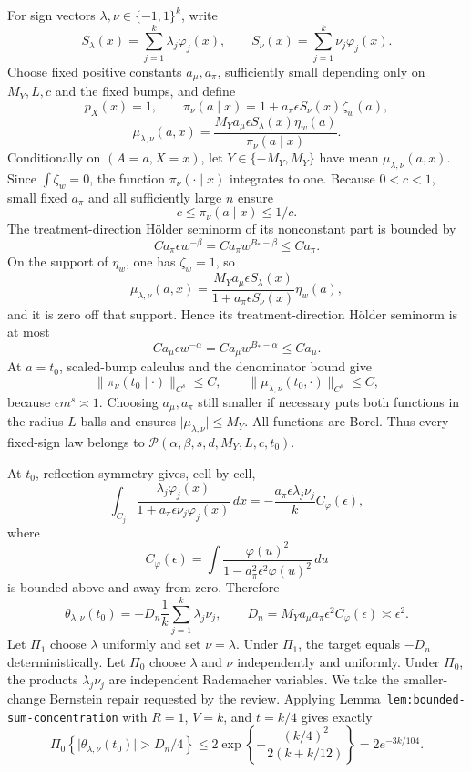 For sign vectors \(\lambda,\nu\in\{-1,1\}^k\), write
\[
S_\lambda(x)=\sum_{j=1}^k\lambda_j\varphi_j(x),
\qquad
S_\nu(x)=\sum_{j=1}^k\nu_j\varphi_j(x).
\]
Choose fixed positive constants \(a_\mu,a_\pi\), sufficiently small depending only on \(M_Y,L,c\) and the fixed bumps, and define
\[
p_X(x)=1,
\qquad
\pi_\nu(a\mid x)=1+a_\pi\epsilon S_\nu(x)\zeta_w(a),
\]
\[
\mu_{\lambda,\nu}(a,x)
=
\frac{M_Ya_\mu\epsilon S_\lambda(x)\eta_w(a)}
{\pi_\nu(a\mid x)}.
\]
Conditionally on \((A=a,X=x)\), let \(Y\in\{-M_Y,M_Y\}\) have mean \(\mu_{\lambda,\nu}(a,x)\). Since \(\int\zeta_w=0\), the function \(\pi_\nu(\cdot\mid x)\) integrates to one. Because \(0<c<1\), small fixed \(a_\pi\) and all sufficiently large \(n\) ensure
\[
c\le\pi_\nu(a\mid x)\le1/c.
\]
The treatment-direction H\"older seminorm of its nonconstant part is bounded by
\[
C a_\pi\epsilon w^{-\beta}
=C a_\pi w^{B_*-\beta}\le C a_\pi.
\]
On the support of \(\eta_w\), one has \(\zeta_w=1\), so
\[
\mu_{\lambda,\nu}(a,x)
=
\frac{M_Ya_\mu\epsilon S_\lambda(x)}
{1+a_\pi\epsilon S_\nu(x)}\eta_w(a),
\]
and it is zero off that support. Hence its treatment-direction H\"older seminorm is at most
\[
C a_\mu\epsilon w^{-\alpha}
=C a_\mu w^{B_*-\alpha}\le C a_\mu.
\]
At \(a=t_0\), scaled-bump calculus and the denominator bound give
\[
\lVert\pi_\nu(t_0\mid\cdot)\rVert_{C^s}\le C,
\qquad
\lVert\mu_{\lambda,\nu}(t_0,\cdot)\rVert_{C^s}\le C,
\]
because \(\epsilon m^s\asymp1\). Choosing \(a_\mu,a_\pi\) still smaller if necessary puts both functions in the radius-\(L\) balls and ensures \(\lvert\mu_{\lambda,\nu}\rvert\le M_Y\). All functions are Borel. Thus every fixed-sign law belongs to \(\mathcal P(\alpha,\beta,s,d,M_Y,L,c,t_0)\).

At \(t_0\), reflection symmetry gives, cell by cell,
\[
\int_{C_j}
\frac{\lambda_j\varphi_j(x)}{1+a_\pi\epsilon\nu_j\varphi_j(x)}\,dx
=
-\frac{a_\pi\epsilon\lambda_j\nu_j}{k}
C_\varphi(\epsilon),
\]
where
\[
C_\varphi(\epsilon)
=
\int
\frac{\varphi(u)^2}{1-a_\pi^2\epsilon^2\varphi(u)^2}\,du
\]
is bounded above and away from zero. Therefore
\[
\theta_{\lambda,\nu}(t_0)
=
-D_n\frac1k\sum_{j=1}^k\lambda_j\nu_j,
\qquad
D_n=M_Ya_\mu a_\pi\epsilon^2C_\varphi(\epsilon)
\asymp\epsilon^2.
\]
Let \(\Pi_1\) choose \(\lambda\) uniformly and set \(\nu=\lambda\). Under \(\Pi_1\), the target equals \(-D_n\) deterministically. Let \(\Pi_0\) choose \(\lambda\) and \(\nu\) independently and uniformly. Under \(\Pi_0\), the products \(\lambda_j\nu_j\) are independent Rademacher variables. We take the smaller-change Bernstein repair requested by the review. Applying Lemma~\texttt{lem:bounded-sum-concentration} with \(R=1\), \(V=k\), and \(t=k/4\) gives exactly
\[
\Pi_0\left\{\lvert\theta_{\lambda,\nu}(t_0)\rvert>D_n/4\right\}
\le
2\exp\left\{-\frac{(k/4)^2}{2(k+k/12)}\right\}
=2e^{-3k/104}.
\]

